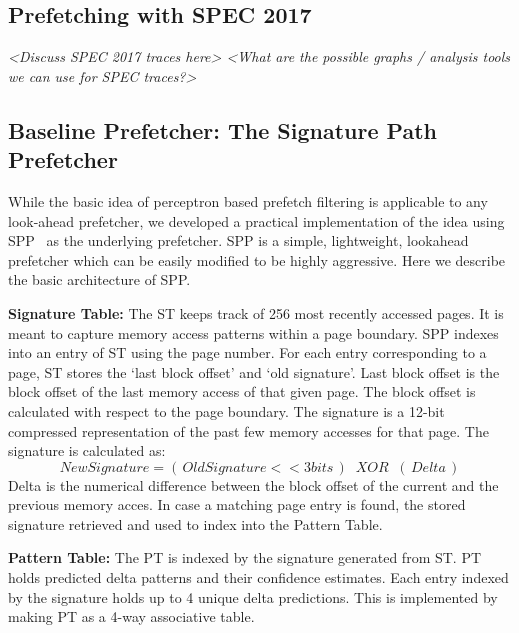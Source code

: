 \subsection{Prefetching with SPEC 2017} \label{Background-SPEC2017}

\textit{<Discuss SPEC 2017 traces here> <What are the possible graphs /
analysis tools we can use for SPEC traces?>}

\subsection{Baseline Prefetcher: The Signature Path Prefetcher}
\label{Background-SPP}

While the basic idea of perceptron based prefetch filtering is applicable to
any look-ahead prefetcher, we developed a practical implementation of the idea
using SPP~\cite{SPP} as the underlying prefetcher.  SPP is a simple,
lightweight, lookahead prefetcher which can be easily modified to be highly
aggressive.  Here we describe the basic architecture of SPP.


\textbf{Signature Table:} The ST keeps track of 256 most recently accessed
pages.  It is meant to capture memory access patterns within a page
boundary.  SPP indexes into an entry of ST using the page number.  For
each entry corresponding to a page, ST stores the `last block offset'
and `old signature'.  Last block offset is the block offset of the
last memory access of that given page.  The block offset is calculated
with respect to the page boundary.  The signature is a 12-bit
compressed representation of the past few memory accesses for that
page.  The signature is calculated as:
$$New Signature = (\,Old Signature << 3 bits\,) \;\;XOR\;\; (\,Delta\,)$$ 
Delta is the numerical difference between the block offset of the 
current and the previous memory acces. In case a matching page entry 
is found, the stored signature retrieved and used to index into the 
Pattern Table.

\textbf{Pattern Table:} The PT is indexed by the signature generated
from ST.  PT holds predicted delta patterns and their confidence
estimates.  Each entry indexed by the signature holds up to 4 unique
delta predictions.  This is implemented by making PT as a 4-way
associative table.

